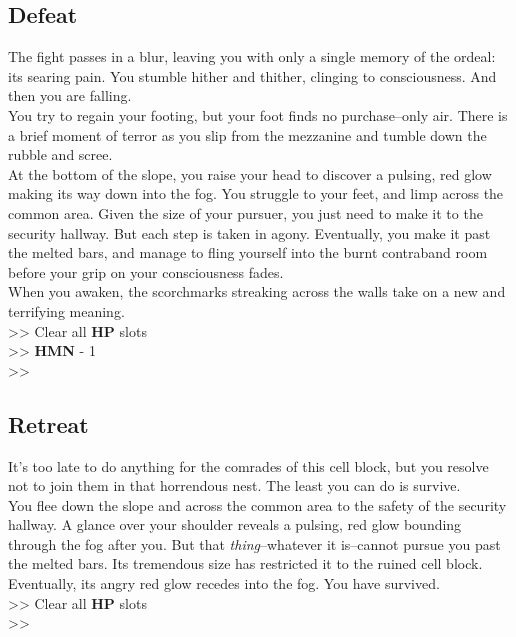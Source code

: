 \subsection*{Defeat}
The fight passes in a blur, leaving you with only a single memory of the ordeal: its searing pain. You stumble hither and thither, clinging to consciousness. And then you are falling.\\

You try to regain your footing, but your foot finds no purchase--only air. There is a brief moment of terror as you slip from the mezzanine and tumble down the rubble and scree.\\

At the bottom of the slope, you raise your head to discover a pulsing, red glow making its way down into the fog. You struggle to your feet, and limp across the common area. Given the size of your pursuer, you just need to make it to the security hallway. But each step is taken in agony. Eventually, you make it past the melted bars, and manage to fling yourself into the burnt contraband room before your grip on your consciousness fades.\\

When you awaken, the scorchmarks streaking across the walls take on a new and terrifying meaning.\\

>> Clear all \textbf{HP} slots\\
>> \textbf{HMN} - 1\\
>> 

\subsection*{Retreat}
It’s too late to do anything for the comrades of this cell block, but you resolve not to join them in that horrendous nest. The least you can do is survive.\\

You flee down the slope and across the common area to the safety of the security hallway. A glance over your shoulder reveals a pulsing, red glow bounding through the fog after you. But that \emph{thing}--whatever it is--cannot pursue you past the melted bars. Its tremendous size has restricted it to the ruined cell block. Eventually, its angry red glow recedes into the fog. You have survived.\\

>> Clear all \textbf{HP} slots\\
>> 
